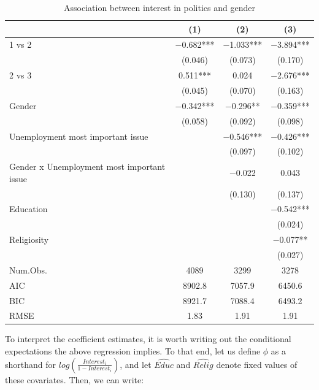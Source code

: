 \documentclass[
]{article}
\begin{document}
\begin{table}[!h]

\caption{\label{tab:gender-interest-relation}Association between interest in politics and gender}
\centering
\begin{tabular}[t]{lccc}
\toprule
  & (1) & (2) & (3)\\
\midrule
1 vs 2 & \num{-0.682}*** & \num{-1.033}*** & \num{-3.894}***\\
 & (\num{0.046}) & (\num{0.073}) & (\num{0.170})\\
2 vs 3 & \num{0.511}*** & \num{0.024} & \num{-2.676}***\\
 & (\num{0.045}) & (\num{0.070}) & (\num{0.163})\\
Gender & \num{-0.342}*** & \num{-0.296}** & \num{-0.359}***\\
 & (\num{0.058}) & (\num{0.092}) & (\num{0.098})\\
Unemployment most important issue &  & \num{-0.546}*** & \num{-0.426}***\\
 &  & (\num{0.097}) & (\num{0.102})\\
Gender x Unemployment most important issue &  & \num{-0.022} & \num{0.043}\\
 &  & (\num{0.130}) & (\num{0.137})\\
Education &  &  & \num{-0.542}***\\
 &  &  & (\num{0.024})\\
Religiosity &  &  & \num{-0.077}**\\
 &  &  & (\num{0.027})\\
\midrule
Num.Obs. & \num{4089} & \num{3299} & \num{3278}\\
AIC & \num{8902.8} & \num{7057.9} & \num{6450.6}\\
BIC & \num{8921.7} & \num{7088.4} & \num{6493.2}\\
RMSE & \num{1.83} & \num{1.91} & \num{1.91}\\
\bottomrule
\end{tabular}
\end{table}

To interpret the coefficient estimates, it is worth writing out the
conditional expectations the above regression implies. To that end, let
us define \(\phi\) as a shorthand for
\(log(\frac{Interest_{i}}{1-Interest_{i}})\), and let \(\hat{Educ}\) and
\(\hat{Relig}\) denote fixed values of these covariates. Then, we can
write:
\end{document}
